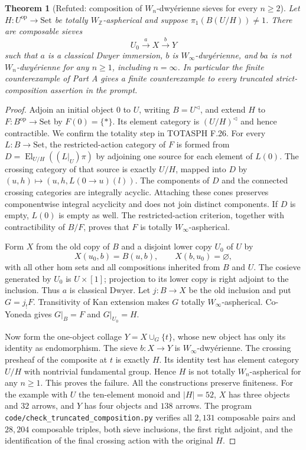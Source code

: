 \documentclass[11pt,a4paper]{article}
\newtheorem{theorem}{Theorem}[section]
\theoremstyle{definition}
\theoremstyle{remark}
\begin{document}
\begin{theorem}[Refuted: composition of $W_n$-dwy\'erienne sieves for every $n\geq2$]\label{C:strict-composition-failure}
Let $H:U^{\mathrm{op}}\to\mathrm{Set}$ be totally $W_{\mathbb Z}$-aspherical and suppose $\pi_1(B(U/H))\ne1$. There are composable sieves
\[
 U_0\xrightarrow{a}X\xrightarrow{b}Y
\]
such that $a$ is a classical Dwyer immersion, $b$ is $W_\infty$-dwy\'erienne, and $ba$ is not $W_n$-dwy\'erienne for any $n\geq1$, including $n=\infty$. In particular the finite counterexample of Part A gives a finite counterexample to every truncated strict-composition assertion in the prompt.
\end{theorem}
\begin{proof}
Adjoin an initial object $0$ to $U$, writing $B=U^{\triangleleft}$, and extend $H$ to $F:B^{\mathrm{op}}\to\mathrm{Set}$ by $F(0)=\{*\}$. Its element category is $(U/H)^{\triangleleft}$ and hence contractible. We confirm the totality step in TOTASPH F.26. For every $L:B\to\mathrm{Set}$, the restricted-action category of $F$ is formed from $D=\operatorname{El}_{U/H}((L|_U)\pi)$ by adjoining one source for each element of $L(0)$. The crossing category of that source is exactly $U/H$, mapped into $D$ by $(u,h)\mapsto(u,h,L(0\to u)(l))$. The components of $D$ and the connected crossing categories are integrally acyclic. Attaching these cones preserves componentwise integral acyclicity and does not join distinct components. If $D$ is empty, $L(0)$ is empty as well. The restricted-action criterion, together with contractibility of $B/F$, proves that $F$ is totally $W_\infty$-aspherical.

Form $X$ from the old copy of $B$ and a disjoint lower copy $U_0$ of $U$ by
\[
 X(u_0,b)=B(u,b),\qquad X(b,u_0)=\varnothing,
\]
with all other hom sets and all compositions inherited from $B$ and $U$. The cosieve generated by $U_0$ is $U\times[1]$; projection to its lower copy is right adjoint to the inclusion. Thus $a$ is classical Dwyer. Let $j:B\to X$ be the old inclusion and put $G=j_!F$. Transitivity of Kan extension makes $G$ totally $W_\infty$-aspherical. Co-Yoneda gives $G|_B=F$ and $G|_{U_0}=H$.

Now form the one-object collage $Y=X\cup_G\{t\}$, whose new object has only its identity as endomorphism. The sieve $b:X\to Y$ is $W_\infty$-dwy\'erienne. The crossing presheaf of the composite at $t$ is exactly $H$. Its identity test has element category $U/H$ with nontrivial fundamental group. Hence $H$ is not totally $W_n$-aspherical for any $n\geq1$. This proves the failure. All the constructions preserve finiteness. For the example with $U$ the ten-element monoid and $|H|=52$, $X$ has three objects and $32$ arrows, and $Y$ has four objects and $138$ arrows. The program \texttt{code/check\_truncated\_composition.py} verifies all $2{,}131$ composable pairs and $28{,}204$ composable triples, both sieve inclusions, the first right adjoint, and the identification of the final crossing action with the original $H$.
\end{proof}
\end{document}

